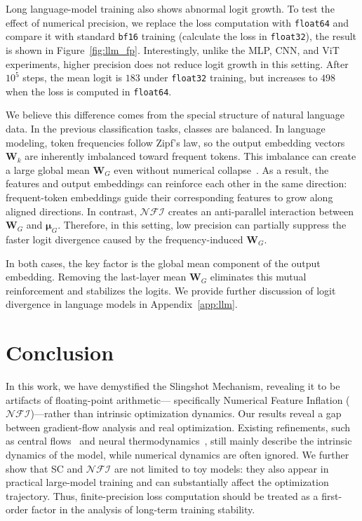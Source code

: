\documentclass{article}
\theoremstyle{plain}
\theoremstyle{definition}
\theoremstyle{remark}
\begin{document}
Long language-model training also shows abnormal logit growth. 
To test the effect of numerical precision, we replace the loss computation with \texttt{float64} and 
compare it with standard \texttt{bf16} training (calculate the loss in \texttt{float32}), the result is shown in Figure~\ref{fig:llm_fp}. 
Interestingly, unlike the MLP, CNN, and ViT experiments, 
higher precision does not reduce logit growth in this setting. 
After $10^5$ steps, the mean logit is $183$ under \texttt{float32} training, 
but increases to $498$ when the loss is computed in \texttt{float64}.

We believe this difference comes from the special structure of natural language data. 
In the previous classification tasks, classes are balanced. In language modeling, 
token frequencies follow Zipf's law, 
so the output embedding vectors $\bm{W}_k$ are inherently imbalanced toward frequent tokens. 
This imbalance can create a large global mean $\bm{W}_G$ even without numerical collapse~\cite{gao2019}. 
As a result, the features and output embeddings can reinforce each other in the same direction: 
frequent-token embeddings guide their corresponding features to grow along aligned directions. 
In contrast, $\mathcal{NFI}$ creates an anti-parallel interaction between $\bm{W}_G$ and $\bm{\mu}_G$. 
Therefore, in this setting, low precision can partially suppress 
the faster logit divergence caused by the frequency-induced $\bm{W}_G$.

In both cases, the key factor is the global mean component of the output embedding. 
Removing the last-layer mean $\bm{W}_G$ eliminates this mutual reinforcement and stabilizes the logits. 
We provide further discussion of logit divergence in language models in Appendix~\ref{app:llm}.


\section{Conclusion}
In this work, we have demystified the Slingshot Mechanism, 
revealing it to be artifacts of floating-point arithmetic—
specifically Numerical Feature Inflation ($\mathcal{NFI}$)—rather than intrinsic optimization dynamics. 
Our results reveal a gap between gradient-flow analysis and real optimization. 
Existing refinements, such as central flows~\cite{cohen2025} and neural thermodynamics~\cite{ziyin2025}, still mainly describe the intrinsic dynamics of the model, while numerical dynamics are often ignored. 
We further show that SC and $\mathcal{NFI}$ are not limited to toy models: they also appear in practical large-model training and can substantially affect the optimization trajectory. 
Thus, finite-precision loss computation should be treated as a first-order factor in the analysis of long-term training stability.
\end{document}
